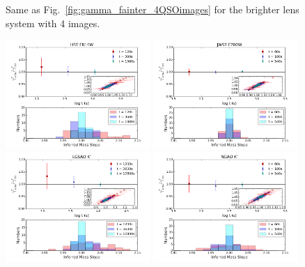 \documentclass[a4paper,11pt]{article}
\begin{document}
{\begin{figure}
\begin{center}
\end{center}
\caption{Same as Fig.~\ref{fig:gamma_fainter_4QSOimages} for the brighter lens system with 4 images.
\label{fig:gamma_brighter_4QSOimages}}
\end{figure}

\begin{figure}
\begin{center}
\includegraphics[width=0.49\textwidth]{figures/gamma_hist_0330_2QSO_HST.png}
\includegraphics[width=0.49\textwidth]{figures/gamma_hist_0330_2QSO_JWST.png} \\
\includegraphics[width=0.49\textwidth]{figures/gamma_hist_0330_2QSO_Keck.png}
\includegraphics[width=0.49\textwidth]{figures/gamma_hist_0330_2QSO_NGAO.png} \\

\end{center}
\end{figure}}
\end{document}
